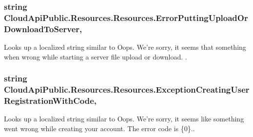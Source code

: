 \hypertarget{class_cloud_api_public_1_1_resources_1_1_resources_a933b73178f56c88ee5e2c1226836ed93}{
\subsubsection[{Error\-Putting\-Upload\-Or\-Download\-To\-Server}]{\setlength{\rightskip}{0pt plus 5cm}string Cloud\-Api\-Public.\-Resources.\-Resources.\-Error\-Putting\-Upload\-Or\-Download\-To\-Server\hspace{0.3cm}{\ttfamily [static]}, {\ttfamily [get]}}}\label{class_cloud_api_public_1_1_resources_1_1_resources_a933b73178f56c88ee5e2c1226836ed93}


Looks up a localized string similar to Oops. We're sorry, it seems that something when wrong while starting a server file upload or download. . 

\hypertarget{class_cloud_api_public_1_1_resources_1_1_resources_a4b199c62caa1e34ada782114db226ac8}{
\subsubsection[{Exception\-Creating\-User\-Registration\-With\-Code}]{\setlength{\rightskip}{0pt plus 5cm}string Cloud\-Api\-Public.\-Resources.\-Resources.\-Exception\-Creating\-User\-Registration\-With\-Code\hspace{0.3cm}{\ttfamily [static]}, {\ttfamily [get]}}}\label{class_cloud_api_public_1_1_resources_1_1_resources_a4b199c62caa1e34ada782114db226ac8}


Looks up a localized string similar to Oops. We're sorry, it seems like something went wrong while creating your account. The error code is \{0\}.. 

